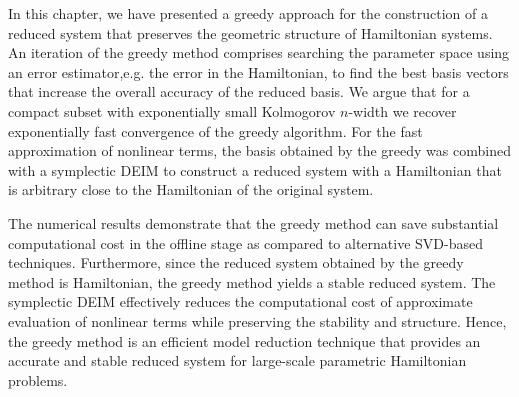 In this chapter, we have presented a greedy approach for the construction of a reduced system that preserves the geometric structure of Hamiltonian systems. An iteration of the greedy method comprises searching the parameter space using an error estimator,e.g. the error in the Hamiltonian, to find the best basis vectors that increase the overall accuracy of the reduced basis. We argue that for a compact subset with exponentially small Kolmogorov $n$-width we recover exponentially fast convergence of the greedy algorithm. For the fast approximation of nonlinear terms, the basis obtained by the greedy was combined with a symplectic DEIM to construct a reduced system with a Hamiltonian that is arbitrary close to the Hamiltonian of the original system.

The numerical results demonstrate that the greedy method can save substantial computational cost in the offline stage as compared to alternative SVD-based techniques. Furthermore, since the reduced system obtained by the greedy method is Hamiltonian, the greedy method yields a stable reduced system. The symplectic DEIM effectively reduces the computational cost of approximate evaluation of nonlinear terms while preserving the stability and structure. Hence, the greedy method is an efficient model reduction technique that provides an accurate and stable reduced system for large-scale parametric Hamiltonian problems.
